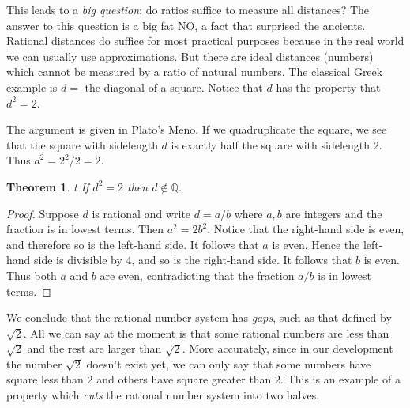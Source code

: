 \documentclass[11pt,oneside]{amsbook}
\newcommand{\QQ}{\mathbb Q}
\theoremstyle{definition}
\theoremstyle{plain}
\newtheorem{thm}{Theorem}[section]
\theoremstyle{definition}
\theoremstyle{remark}
\numberwithin{equation}{section}
\numberwithin{figure}{section}
\begin{document}
This leads to a \emph{big question}: do ratios suffice to measure all distances? The answer to this question is a big fat NO, a fact that surprised the ancients. Rational distances do suffice for most practical purposes because in the real world we can usually use approximations. But there are ideal distances (numbers) which cannot be measured by a ratio of natural numbers. The classical Greek example is $d=$ the diagonal of a square. Notice that $d$ has the property that $d^2=2$.

\begin{center}
\quad
{}
\end{center}

The argument is given in Plato's Meno. If we quadruplicate the square, we see that the square with sidelength $d$ is exactly half the square with sidelength $2$. Thus $d^2=2^2/2=2$.

\begin{thm}t
  \label{thm:root-2-irrational}
  If $d^2=2$ then $d\notin\QQ$.
\end{thm}

\begin{proof}
  Suppose $d$ is rational and write $d=a/b$ where $a,b$ are integers and the fraction is in lowest terms. Then $a^2=2b^2$. Notice that the right-hand side is even, and therefore so is the left-hand side. It follows that $a$ is even. Hence the left-hand side is divisible by $4$, and so is the right-hand side. It follows that $b$ is even. Thus both $a$ and $b$ are even, contradicting that the fraction $a/b$ is in lowest terms.
\end{proof}

We conclude that the rational number system has \emph{gaps}, such as that defined by $\sqrt2$. All we can say at the moment is that some rational numbers are less than $\sqrt2$ and the rest are larger than $\sqrt2$. More accurately, since in our development the number $\sqrt2$ doesn't exist yet, we can only say that some numbers have square less than $2$ and others have square greater than $2$. This is an example of a property which \emph{cuts} the rational number system into two halves.
\end{document}

